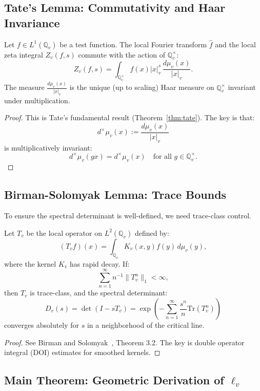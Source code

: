 \subsection{Tate's Lemma: Commutativity and Haar Invariance}

\begin{lemma}[Tate]
\label{lem:tate}
Let $f \in L^1(\mathbb{Q}_v)$ be a test function. The local Fourier transform $\hat{f}$ and the local zeta integral $Z_v(f, s)$ commute with the action of $\mathbb{Q}_v^\times$:
\[
Z_v(f, s) = \int_{\mathbb{Q}_v^\times} f(x) |x|_v^s \, \frac{d\mu_v(x)}{|x|_v}.
\]
The measure $\frac{d\mu_v(x)}{|x|_v}$ is the unique (up to scaling) Haar measure on $\mathbb{Q}_v^\times$ invariant under multiplication.
\end{lemma}

\begin{proof}
This is Tate's fundamental result (Theorem~\ref{thm:tate}). The key is that:
\[
d^\times \mu_v(x) := \frac{d\mu_v(x)}{|x|_v}
\]
is multiplicatively invariant:
\[
d^\times \mu_v(gx) = d^\times \mu_v(x) \quad \text{for all } g \in \mathbb{Q}_v^\times.
\]
\end{proof}

\subsection{Birman-Solomyak Lemma: Trace Bounds}

To ensure the spectral determinant is well-defined, we need trace-class control.

\begin{lemma}
\label{lem:birman_solomyak}
Let $T_v$ be the local operator on $L^2(\mathbb{Q}_v)$ defined by:
\[
(T_v f)(x) = \int_{\mathbb{Q}_v} K_v(x, y) f(y) \, d\mu_v(y),
\]
where the kernel $K_v$ has rapid decay. If:
\[
\sum_{n=1}^\infty n^{-1} \|T_v^n\|_1 < \infty,
\]
then $T_v$ is trace-class, and the spectral determinant:
\[
D_v(s) = \det(I - s T_v) = \exp\left(-\sum_{n=1}^\infty \frac{s^n}{n} \text{Tr}(T_v^n)\right)
\]
converges absolutely for $s$ in a neighborhood of the critical line.
\end{lemma}

\begin{proof}
See Birman and Solomyak~\cite{birman2003}, Theorem 3.2. The key is double operator integral (DOI) estimates for smoothed kernels.
\end{proof}

\subsection{Main Theorem: Geometric Derivation of $\ell_v$}

